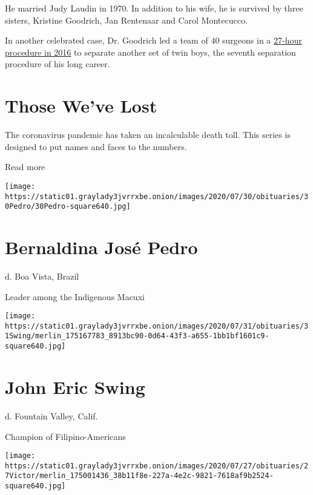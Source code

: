 He married Judy Laudin in 1970. In addition to his wife, he is survived
by three sisters, Kristine Goodrich, Jan Rentenaar and Carol Montecucco.

In another celebrated case, Dr. Goodrich led a team of 40 surgeons in a
\href{https://www.cnn.com/2020/03/30/health/new-york-neurosurgeon-death-coronavirus-mcdonald-twins/index.html}{27-hour
procedure in 2016} to separate another set of twin boys, the seventh
separation procedure of his long career.

\href{https://www.nytimes3xbfgragh.onion/interactive/2020/obituaries/people-died-coronavirus-obituaries.html?action=click\&pgtype=Article\&state=default\&region=BELOW_MAIN_CONTENT\&context=covid_obits_promo}{}

\hypertarget{those-weve-lost}{%
\section{Those We've Lost}\label{those-weve-lost}}

The coronavirus pandemic has taken an incalculable death toll. This
series is designed to put names and faces to the numbers.

Read more

\texttt{[image: https://static01.graylady3jvrrxbe.onion/images/2020/07/30/obituaries/30Pedro/30Pedro-square640.jpg]}

\hypertarget{bernaldina-josuxe9-pedro}{%
\section{Bernaldina José Pedro}\label{bernaldina-josuxe9-pedro}}

d. Boa Vista, Brazil

Leader among the Indigenous Macuxi

\texttt{[image: https://static01.graylady3jvrrxbe.onion/images/2020/07/31/obituaries/31Swing/merlin\_175167783\_8913bc90-0d64-43f3-a655-1bb1bf1601c9-square640.jpg]}

\hypertarget{john-eric-swing}{%
\section{John Eric Swing}\label{john-eric-swing}}

d. Fountain Valley, Calif.

Champion of Filipino-Americans

\texttt{[image: https://static01.graylady3jvrrxbe.onion/images/2020/07/27/obituaries/27Victor/merlin\_175001436\_38b11f8e-227a-4e2c-9821-7618af9b2524-square640.jpg]}

